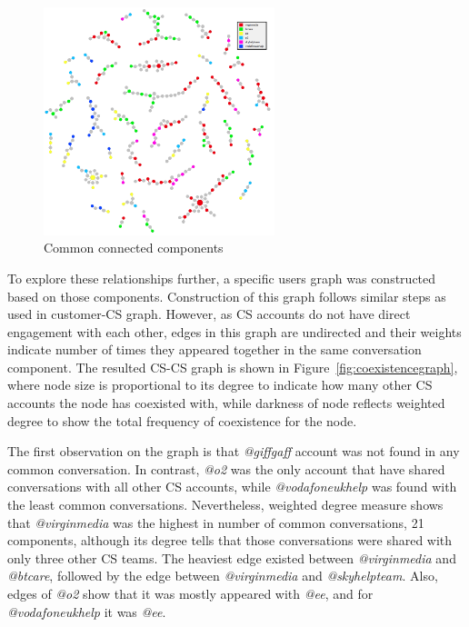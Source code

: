 \documentclass[sigconf]{acmart}
\begin{document}
{\begin{figure}[htb]
\centering
\includegraphics[width=0.6\textwidth]{images/commoncc.png}
\caption{Common connected components}
\label{fig:commoncc}
\end{figure}

To explore these relationships further, a specific users graph was
constructed based on those components. Construction of this graph
follows similar steps as used in customer-CS graph. However, as CS
accounts do not have direct engagement with each other, edges in this
graph are undirected and their weights indicate number of times they
appeared together in the same conversation component.  The resulted
CS-CS graph is shown in Figure~\ref{fig:coexistencegraph}, where node
size is proportional to its degree to indicate how many other CS accounts the
node has coexisted with, while darkness of node reflects weighted
degree to show the total frequency of coexistence for the node.

The first observation on the graph is that {\emph{@giffgaff}} account
was not found in any common conversation. In contrast, {\emph{@o2}}
was the only account that have shared conversations with all other CS
accounts, while {\emph{@vodafoneukhelp}} was found with the least
common conversations. Nevertheless, weighted degree measure shows that
{\emph{@virginmedia}} was the highest in number of common
conversations, 21 components, although its degree tells that those
conversations were shared with only three other CS teams. The heaviest
edge existed between {\emph{@virginmedia}} and {\emph{@btcare}},
followed by the edge between {\emph{@virginmedia}} and
{\emph{@skyhelpteam}}. Also, edges of {\emph{@o2}} show that it was
mostly appeared with {\emph{@ee}}, and for {\emph{@vodafoneukhelp}} it
was {\emph{@ee}}.

}
\end{document}
